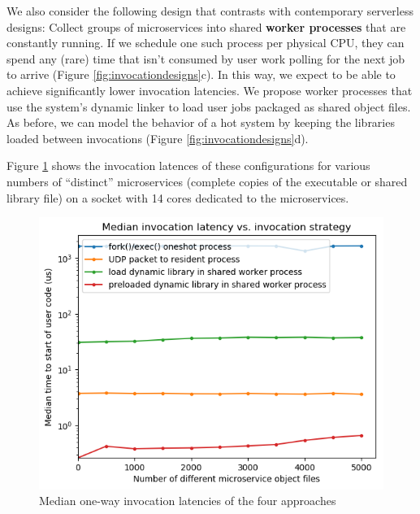 We also consider the following design that contrasts with contemporary serverless designs:
Collect groups of microservices into shared \textbf{worker processes} that are constantly running.
If we schedule one such process per physical CPU, they can spend any (rare) time that isn't consumed by user work polling for the next job to arrive (Figure \ref{fig:invocationdesigns}c).
In this way, we expect to be able to achieve significantly lower invocation latencies.
We propose worker processes that use the system's dynamic linker to load user jobs packaged as shared object files.
As before, we can model the behavior of a hot system by keeping the libraries loaded between invocations (Figure \ref{fig:invocationdesigns}d).

Figure \ref{fig:motive} shows the invocation latences of these configurations for various numbers of ``distinct'' microservices (complete copies of the executable or shared library file) on a socket with 14 cores dedicated to the microservices.

\begin{figure}
\includegraphics[width=\columnwidth]{figs/2017-01-31-motivation_numfuns-latency_log}
\caption{Median one-way invocation latencies of the four approaches}
\label{fig:motive}
\end{figure}

